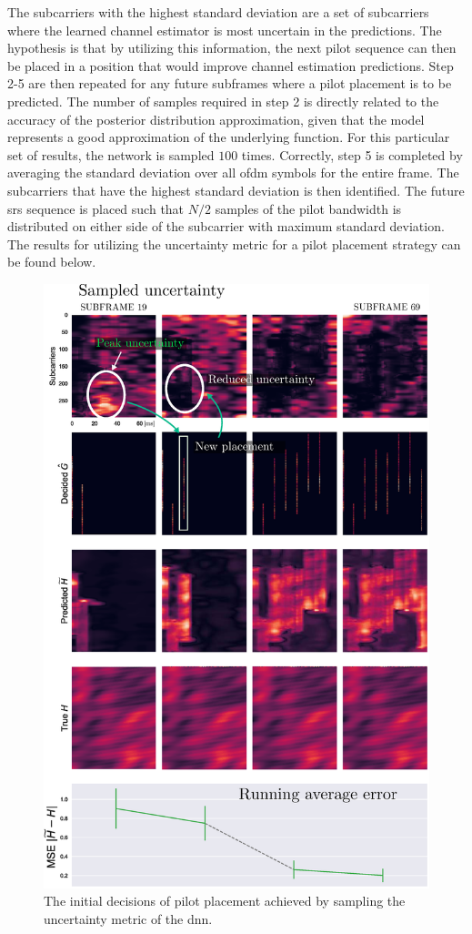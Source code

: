 The subcarriers with the highest standard deviation are a set of subcarriers where the learned channel estimator is most uncertain in the predictions. The hypothesis is that by utilizing this information, the next pilot sequence can then be placed in a position that would improve channel estimation predictions. Step 2-5 are then repeated for any future subframes where a pilot placement is to be predicted. The number of samples required in step 2 is directly related to the accuracy of the posterior distribution approximation, given that the model represents a good approximation of the underlying function. For this particular set of results, the network is sampled $100$ times. Correctly, step 5 is completed by averaging the standard deviation over all \gls{ofdm} symbols for the entire frame. The subcarriers that have the highest standard deviation is then identified. The future \gls{srs} sequence is placed such that $N/2$ samples of the pilot bandwidth is distributed on either side of the subcarrier with maximum standard deviation. The results for utilizing the uncertainty metric for a pilot placement strategy can be found below. 
\begin{figure}
    \centering
    \includegraphics{chapters/part_uplink/figures/results/channel_estimation/decision_example_imshow.eps}
    \caption{The initial decisions of pilot placement achieved by sampling the uncertainty metric of the \gls{dnn}.}
    \label{fig:decision_example}
\end{figure}
